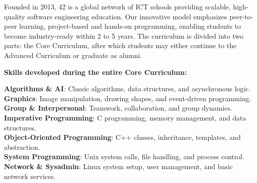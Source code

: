 \documentclass[11pt]{article}
\begin{document}
{{{{	

\vspace{0.5cm}

\fontsize{11}{13}\selectfont
\begin{flushleft}
	Founded in 2013, 42 is a global network of ICT schools providing scalable, high-quality software engineering education.
	Our innovative model emphasizes peer-to-peer learning, project-based and hands-on programming, enabling students to become industry-ready within 2 to 5 years.
	The curriculum is divided into two parts: the Core Curriculum, after which students may either continue to the Advanced Curriculum or graduate as alumni.
	
\end{flushleft}

\vspace{0.5em}

\noindent\textbf{Skills developed during the entire Core Curriculum:}
\vspace{0.5em}

\noindent \textbf{Algorithms \& AI}: Classic algorithms, data structures, and asynchronous logic.\\

\noindent \textbf{Graphics}: Image manipulation, drawing shapes, and event-driven programming.\\

\noindent \textbf{Group \& Interpersonal}: Teamwork, collaboration, and group dynamics.\\

\noindent \textbf{Imperative Programming}: C programming, memory management, and data structures.\\

\noindent \textbf{Object-Oriented Programming}: C++ classes, inheritance, templates, and abstraction.\\

\noindent \textbf{System Programming}: Unix system calls, file handling, and process control.\\

\noindent \textbf{Network \& Sysadmin}: Linux system setup, user management, and basic network services.\\

}}}}
\end{document}
